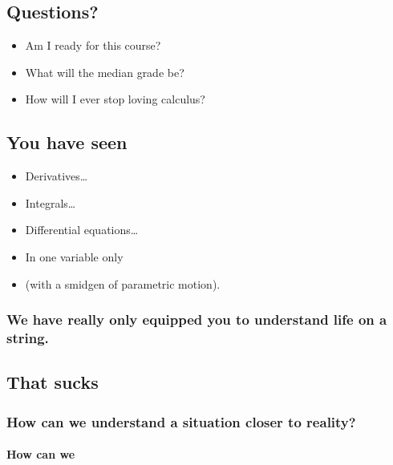 \documentclass[]{article}
\begin{document}
\subsection{Questions?}\label{questions}

\begin{itemize}
\itemsep1pt\parskip0pt
\item
  Am I ready for this course?
\item
  What will the median grade be?
\item
  How will I ever stop loving calculus?
\end{itemize}

\subsection{You have seen}\label{you-have-seen}

\begin{itemize}
\itemsep1pt\parskip0pt
\item
  Derivatives\ldots{}
\item
  Integrals\ldots{}
\item
  Differential equations\ldots{}
\item
  In one variable only
\item
  (with a smidgen of parametric motion).
\end{itemize}

\subsubsection{We have really only equipped you to understand life on a
string.}\label{we-have-really-only-equipped-you-to-understand-life-on-a-string.}

\subsection{That sucks}\label{that-sucks}

\subsubsection{How can we understand a situation closer to
reality?}\label{how-can-we-understand-a-situation-closer-to-reality}

\paragraph{How can we}\label{how-can-we}
\end{document}

